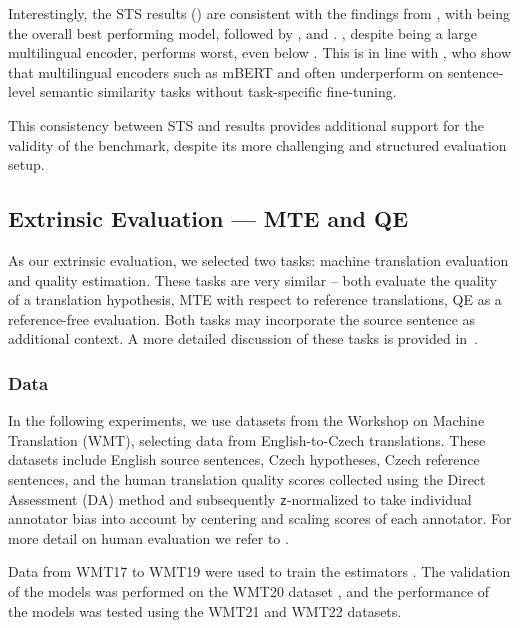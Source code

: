Interestingly, the STS results () are consistent with the findings from \costra, with \simcse being the overall best performing model, followed by \mepet, \labse and \retromae.
\xlmr, despite being a large multilingual encoder, performs worst, even below \randombert. This is in line with \cite{litschko:2022}, who show that multilingual encoders such as mBERT and \xlmr often underperform on sentence-level semantic similarity tasks without task-specific fine-tuning. 

This consistency between STS and \costra results provides additional support for the validity of the \costra benchmark, despite its more challenging and structured evaluation setup.

\subsection{Extrinsic Evaluation --- MTE and QE}
As our extrinsic evaluation, we selected two tasks: machine translation evaluation and quality estimation. These tasks are very similar -- both evaluate the quality of a translation hypothesis, MTE with respect to reference translations, QE as a reference-free evaluation. Both tasks may incorporate the source sentence as additional context. A more detailed discussion of these tasks is provided in~.

\subsubsection{Data}
In the following experiments, we use datasets from the Workshop on Machine Translation (WMT), selecting data from English-to-Czech translations. These datasets include English source sentences, Czech hypotheses, Czech reference sentences, and the human translation quality scores collected using the Direct Assessment (DA) method \citep{graham-etal-2013-continuous} and subsequently \texttt{z}-normalized to take individual annotator bias into account by centering and scaling scores of each annotator. For more detail on human evaluation we refer to .

Data from WMT17 to WMT19 \citep{wmt2017, bojar-etal-2018-findings, barrault-etal-2019-findings} were used to train the \comet estimators \citep{rei-etal-2020-comet}. The validation of the models was performed on the WMT20 dataset \citep{barrault-etal-2020-findings}, and the performance of the models was tested using the WMT21 \cite{akhbardeh-etal-2021-findings} and WMT22 \citep{kocmi-etal-2022-findings} datasets.

